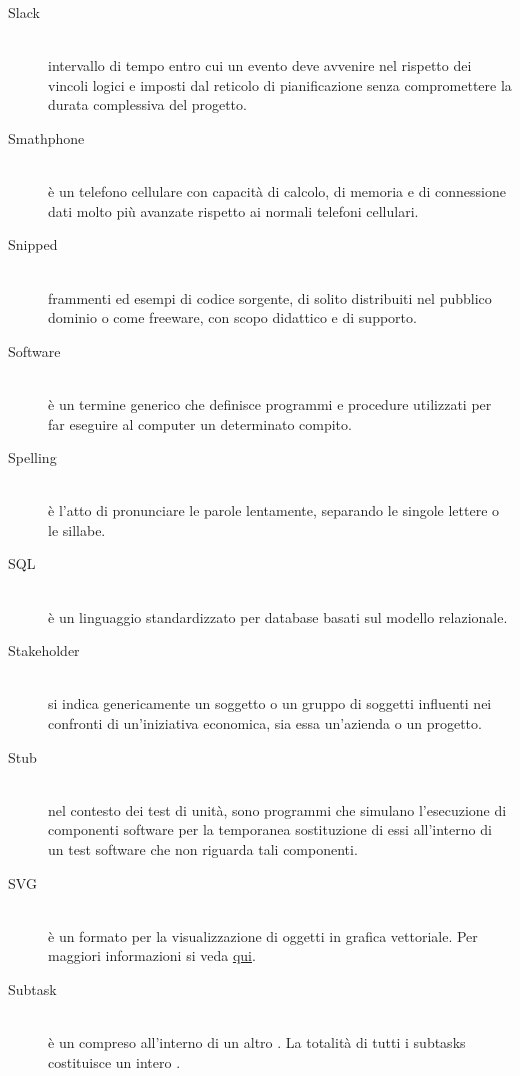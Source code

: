 \documentclass[12pt,a4paper]{article}
\begin{document}
\begin{description}
\item[Slack] 
\hfill\\intervallo di tempo entro cui un evento deve avvenire nel rispetto dei vincoli logici e imposti dal reticolo di pianificazione senza compromettere la durata complessiva del progetto.

\item[Smathphone] 
\hfill\\è un telefono cellulare con capacità di calcolo, di memoria e di connessione dati molto più avanzate rispetto ai normali telefoni cellulari.

\item[Snipped] 
\hfill\\frammenti ed esempi di codice sorgente, di solito distribuiti nel pubblico dominio o come freeware, con scopo didattico e di supporto.

\item[Software] 
\hfill\\è un termine generico che definisce programmi e procedure utilizzati per far eseguire al computer un determinato compito.

\item[Spelling] 
\hfill\\è l'atto di pronunciare le parole lentamente, separando le singole lettere o le sillabe.

\item[SQL] 
\hfill\\è un linguaggio standardizzato per database basati sul modello relazionale.

\item[Stakeholder] 
\hfill\\si indica genericamente un soggetto o un gruppo di soggetti influenti nei confronti di un'iniziativa economica, sia essa un'azienda o un progetto.

\item[Stub] 
\hfill\\nel contesto dei test di unità, sono programmi che simulano l'esecuzione di componenti software per la temporanea sostituzione di essi all'interno di un test software che non riguarda tali componenti.

\item[SVG] 
\hfill\\è un formato per la visualizzazione di oggetti in grafica vettoriale. Per maggiori informazioni si veda \href{https://it.wikipedia.org/wiki/Scalable_Vector_Graphics}{qui}.

\item[Subtask] 
\hfill\\è un  compreso all'interno di un altro . La totalità di tutti i subtasks costituisce un intero .
\end{description}
\end{document}
